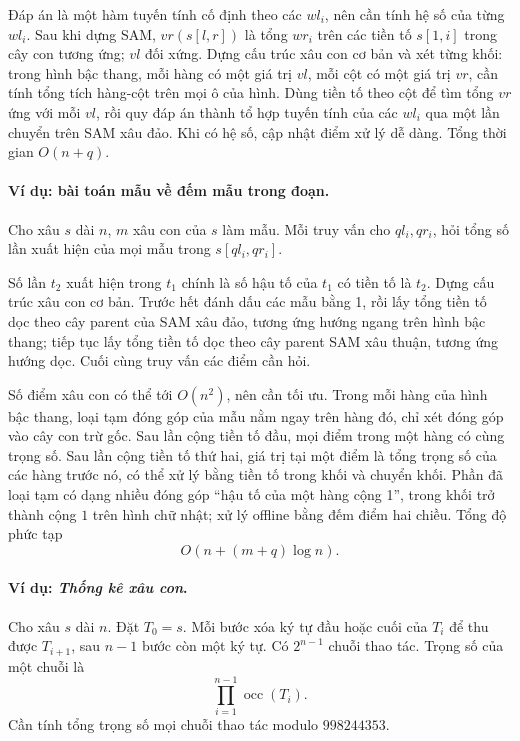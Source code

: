 \documentclass[11pt]{article}
\begin{document}
Đáp án là một hàm tuyến tính cố định theo các \(wl_i\), nên cần tính hệ số của
từng \(wl_i\). Sau khi dựng SAM, \(vr(s[l,r])\) là tổng \(wr_i\) trên các
tiền tố \(s[1,i]\) trong cây con tương ứng; \(vl\) đối xứng. Dựng cấu trúc xâu
con cơ bản và xét từng khối: trong hình bậc thang, mỗi hàng có một giá trị
\(vl\), mỗi cột có một giá trị \(vr\), cần tính tổng tích hàng-cột trên mọi ô
của hình. Dùng tiền tố theo cột để tìm tổng \(vr\) ứng với mỗi \(vl\), rồi quy
đáp án thành tổ hợp tuyến tính của các \(wl_i\) qua một lần chuyển trên SAM xâu
đảo. Khi có hệ số, cập nhật điểm xử lý dễ dàng. Tổng thời gian \(O(n+q)\).

\paragraph{Ví dụ: bài toán mẫu về đếm mẫu trong đoạn.}
Cho xâu \(s\) dài \(n\), \(m\) xâu con của \(s\) làm mẫu. Mỗi truy vấn cho
\(ql_i,qr_i\), hỏi tổng số lần xuất hiện của mọi mẫu trong \(s[ql_i,qr_i]\).

Số lần \(t_2\) xuất hiện trong \(t_1\) chính là số hậu tố của \(t_1\) có tiền
tố là \(t_2\). Dựng cấu trúc xâu con cơ bản. Trước hết đánh dấu các mẫu bằng
1, rồi lấy tổng tiền tố dọc theo cây parent của SAM xâu đảo, tương ứng hướng
ngang trên hình bậc thang; tiếp tục lấy tổng tiền tố dọc theo cây parent SAM
xâu thuận, tương ứng hướng dọc. Cuối cùng truy vấn các điểm cần hỏi.

Số điểm xâu con có thể tới \(O(n^2)\), nên cần tối ưu. Trong mỗi hàng của hình
bậc thang, loại tạm đóng góp của mẫu nằm ngay trên hàng đó, chỉ xét đóng góp
vào cây con trừ gốc. Sau lần cộng tiền tố đầu, mọi điểm trong một hàng có cùng
trọng số. Sau lần cộng tiền tố thứ hai, giá trị tại một điểm là tổng trọng số
của các hàng trước nó, có thể xử lý bằng tiền tố trong khối và chuyển khối.
Phần đã loại tạm có dạng nhiều đóng góp ``hậu tố của một hàng cộng 1'', trong
khối trở thành cộng \(1\) trên hình chữ nhật; xử lý offline bằng đếm điểm hai
chiều. Tổng độ phức tạp
\[
  O(n+(m+q)\log n).
\]

\paragraph{Ví dụ: \emph{Thống kê xâu con}.}
Cho xâu \(s\) dài \(n\). Đặt \(T_0=s\). Mỗi bước xóa ký tự đầu hoặc cuối của
\(T_i\) để thu được \(T_{i+1}\), sau \(n-1\) bước còn một ký tự. Có
\(2^{n-1}\) chuỗi thao tác. Trọng số của một chuỗi là
\[
  \prod_{i=1}^{n-1}\operatorname{occ}(T_i).
\]
Cần tính tổng trọng số mọi chuỗi thao tác modulo \(998244353\).
\end{document}
